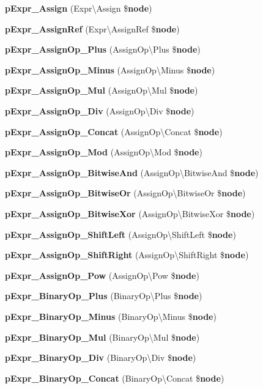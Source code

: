 \begin{DoxyCompactItemize}
\item 
{\bf p\+Expr\+\_\+\+Assign} (Expr\textbackslash{}\+Assign \${\bf node})
\item 
{\bf p\+Expr\+\_\+\+Assign\+Ref} (Expr\textbackslash{}\+Assign\+Ref \${\bf node})
\item 
{\bf p\+Expr\+\_\+\+Assign\+Op\+\_\+\+Plus} (Assign\+Op\textbackslash{}\+Plus \${\bf node})
\item 
{\bf p\+Expr\+\_\+\+Assign\+Op\+\_\+\+Minus} (Assign\+Op\textbackslash{}\+Minus \${\bf node})
\item 
{\bf p\+Expr\+\_\+\+Assign\+Op\+\_\+\+Mul} (Assign\+Op\textbackslash{}\+Mul \${\bf node})
\item 
{\bf p\+Expr\+\_\+\+Assign\+Op\+\_\+\+Div} (Assign\+Op\textbackslash{}\+Div \${\bf node})
\item 
{\bf p\+Expr\+\_\+\+Assign\+Op\+\_\+\+Concat} (Assign\+Op\textbackslash{}\+Concat \${\bf node})
\item 
{\bf p\+Expr\+\_\+\+Assign\+Op\+\_\+\+Mod} (Assign\+Op\textbackslash{}\+Mod \${\bf node})
\item 
{\bf p\+Expr\+\_\+\+Assign\+Op\+\_\+\+Bitwise\+And} (Assign\+Op\textbackslash{}\+Bitwise\+And \${\bf node})
\item 
{\bf p\+Expr\+\_\+\+Assign\+Op\+\_\+\+Bitwise\+Or} (Assign\+Op\textbackslash{}\+Bitwise\+Or \${\bf node})
\item 
{\bf p\+Expr\+\_\+\+Assign\+Op\+\_\+\+Bitwise\+Xor} (Assign\+Op\textbackslash{}\+Bitwise\+Xor \${\bf node})
\item 
{\bf p\+Expr\+\_\+\+Assign\+Op\+\_\+\+Shift\+Left} (Assign\+Op\textbackslash{}\+Shift\+Left \${\bf node})
\item 
{\bf p\+Expr\+\_\+\+Assign\+Op\+\_\+\+Shift\+Right} (Assign\+Op\textbackslash{}\+Shift\+Right \${\bf node})
\item 
{\bf p\+Expr\+\_\+\+Assign\+Op\+\_\+\+Pow} (Assign\+Op\textbackslash{}\+Pow \${\bf node})
\item 
{\bf p\+Expr\+\_\+\+Binary\+Op\+\_\+\+Plus} (Binary\+Op\textbackslash{}\+Plus \${\bf node})
\item 
{\bf p\+Expr\+\_\+\+Binary\+Op\+\_\+\+Minus} (Binary\+Op\textbackslash{}\+Minus \${\bf node})
\item 
{\bf p\+Expr\+\_\+\+Binary\+Op\+\_\+\+Mul} (Binary\+Op\textbackslash{}\+Mul \${\bf node})
\item 
{\bf p\+Expr\+\_\+\+Binary\+Op\+\_\+\+Div} (Binary\+Op\textbackslash{}\+Div \${\bf node})
\item 
{\bf p\+Expr\+\_\+\+Binary\+Op\+\_\+\+Concat} (Binary\+Op\textbackslash{}\+Concat \${\bf node})

\end{DoxyCompactItemize}
